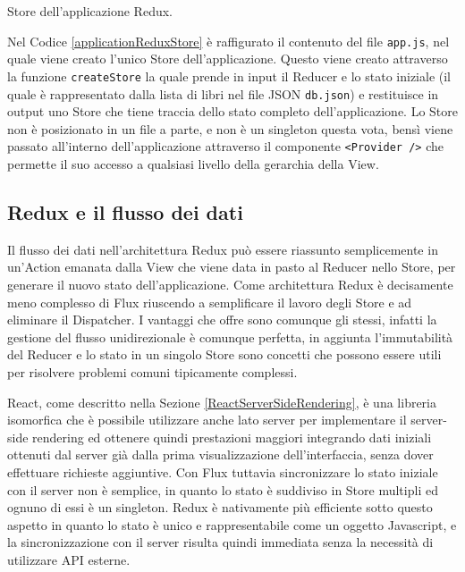 \begin{listing}[ht]
\inputminted{javascript}{sources/applicationReduxStore.js}
\caption{Store dell'applicazione Redux.} 
\label{applicationReduxStore} 
\end{listing}

Nel Codice \ref{applicationReduxStore} è raffigurato il contenuto del file \texttt{app.js}, nel quale viene creato l'unico Store dell'applicazione. Questo viene creato attraverso
la funzione \texttt{createStore} la quale prende in input il Reducer e lo stato iniziale (il quale è rappresentato dalla lista di libri nel file JSON \texttt{db.json}) e restituisce in output uno Store che tiene traccia dello stato completo dell'applicazione.
Lo Store non è posizionato in un file a parte, e non è un singleton questa vota, bensì viene passato all'interno dell'applicazione attraverso il componente \texttt{<Provider />} che permette il suo accesso a qualsiasi livello della gerarchia della View.

\subsection{Redux e il flusso dei dati}
Il flusso dei dati nell'architettura Redux può essere riassunto semplicemente in un'Action emanata dalla View che viene data in pasto al Reducer nello Store, per generare il nuovo stato dell'applicazione.
Come architettura Redux è decisamente meno complesso di Flux riuscendo a semplificare il lavoro degli Store e ad eliminare il Dispatcher. I vantaggi che offre sono comunque gli stessi, infatti la gestione del flusso unidirezionale è comunque perfetta, in aggiunta l'immutabilità del Reducer e lo stato in un singolo Store sono concetti che possono essere utili per risolvere problemi comuni tipicamente complessi.

React, come descritto nella Sezione \ref{ReactServerSideRendering}, è una libreria isomorfica che è possibile utilizzare anche lato server per implementare il server-side rendering ed ottenere quindi prestazioni maggiori integrando dati iniziali ottenuti dal server già dalla prima visualizzazione dell'interfaccia, senza dover effettuare richieste aggiuntive. Con Flux tuttavia sincronizzare lo stato iniziale con il server non è semplice, in quanto lo stato è suddiviso in Store multipli ed ognuno di essi è un singleton. Redux è nativamente più efficiente sotto questo aspetto in quanto lo stato è unico e rappresentabile come un oggetto Javascript, e la sincronizzazione con il server risulta quindi immediata senza la necessità di utilizzare API esterne.

